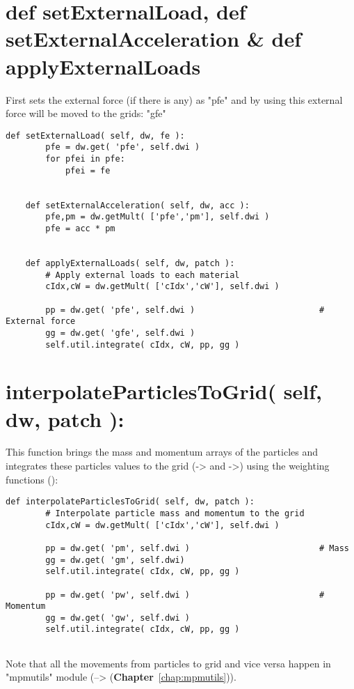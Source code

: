 \documentclass[11pt,fleqn]{book} %
\begin{document}
\section{def setExternalLoad, def setExternalAcceleration \& def applyExternalLoads}
First \TT[setExternalLoad] sets the external force (if there is any) as "pfe" and by using  this external force will be moved to the grids: "gfe"
\begin{lstlisting}
def setExternalLoad( self, dw, fe ):
        pfe = dw.get( 'pfe', self.dwi )
        for pfei in pfe:
            pfei = fe
                
                
    def setExternalAcceleration( self, dw, acc ):
        pfe,pm = dw.getMult( ['pfe','pm'], self.dwi )
        pfe = acc * pm


    def applyExternalLoads( self, dw, patch ):
        # Apply external loads to each material
        cIdx,cW = dw.getMult( ['cIdx','cW'], self.dwi )
        
        pp = dw.get( 'pfe', self.dwi )                         # External force
        gg = dw.get( 'gfe', self.dwi )        
        self.util.integrate( cIdx, cW, pp, gg )         
\end{lstlisting}
\section{interpolateParticlesToGrid( self, dw, patch ):}
This function brings the mass and momentum arrays of the particles and integrates these particles values to the grid (-> and ->) using the weighting functions ():
\begin{lstlisting}
def interpolateParticlesToGrid( self, dw, patch ):
        # Interpolate particle mass and momentum to the grid
        cIdx,cW = dw.getMult( ['cIdx','cW'], self.dwi )     

        pp = dw.get( 'pm', self.dwi )                          # Mass
        gg = dw.get( 'gm', self.dwi)
        self.util.integrate( cIdx, cW, pp, gg )
        
        pp = dw.get( 'pw', self.dwi )                          # Momentum
        gg = dw.get( 'gw', self.dwi )
        self.util.integrate( cIdx, cW, pp, gg )            
        
\end{lstlisting}

Note that all the movements from particles to grid and vice versa happen in "mpmutils" module (--> (\textbf{Chapter}~\ref{chap:mpmutils})).
\end{document}
